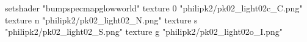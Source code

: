 setshader "bumpspecmapglowworld"
    texture 0 "philipk2/pk02_light02c_C.png"
    texture n "philipk2/pk02_light02_N.png"
    texture s "philipk2/pk02_light02_S.png"
    texture g "philipk2/pk02_light02o_I.png"